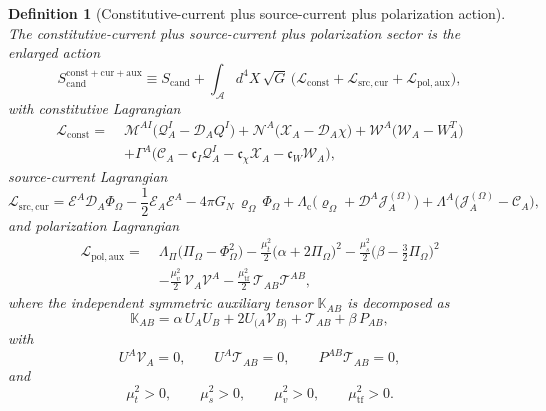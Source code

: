 \documentclass[11pt]{article}
\newcommand{\Sub}{\mathcal{A}}
\newcommand{\ProjSub}{P}
\newcommand{\SpatialD}{\mathcal D}
\newcommand{\FlowPot}{\Phi_\Omega}
\newcommand{\BalanceField}{\Pi_\Omega}
\newcommand{\BalMult}{\Lambda_\Pi}
\newcommand{\SourceDensity}{\varrho_\Omega}
\newcommand{\SourceCurrent}{\mathcal J^{(\Omega)}}
\newcommand{\ConstCurrent}{\mathcal C}
\newcommand{\QCarrier}{\mathcal Q}
\newcommand{\ChiCarrier}{\mathcal X}
\newcommand{\TransCarrier}{\mathcal W}
\newcommand{\ContMult}{\Lambda_{\mathrm c}}
\newcommand{\CurrentMult}{\Lambda}
\newcommand{\ConstGamma}{\Gamma}
\newcommand{\QMult}{\mathscr M}
\newcommand{\ChiMult}{\mathscr N}
\newcommand{\TransMult}{\mathscr W}
\newcommand{\SourceFlux}{\mathcal E}
\newcommand{\AuxPol}{\mathbb K}
\newcommand{\CandAction}{S_{\mathrm{cand}}}
\newcommand{\ConstitutiveAction}{S_{\mathrm{cand}}^{\mathrm{const+cur+aux}}}
\newtheorem{definition}{Definition}
\begin{document}
\begin{definition}[Constitutive-current plus source-current plus polarization action]
\label{def:action}
The \emph{constitutive-current plus source-current plus polarization sector} is the enlarged action
\begin{equation}
\ConstitutiveAction
\equiv
\CandAction
+
\int_{\Sub} d^4X\,\sqrt{G}\,
\bigl(
\mathcal L_{\mathrm{const}}
+\mathcal L_{\mathrm{src,cur}}
+\mathcal L_{\mathrm{pol,aux}}
\bigr),
\label{eq:fullaction}
\end{equation}
with constitutive Lagrangian
\begin{align}
\mathcal L_{\mathrm{const}}
=\;&
\QMult^{AI}\bigl(\QCarrier^I_A-\SpatialD_AQ^I\bigr)
+\ChiMult^A\bigl(\ChiCarrier_A-\SpatialD_A\chi\bigr)
+\TransMult^A\bigl(\TransCarrier_A-W_A^T\bigr)
\nonumber\\
&+\ConstGamma^A\bigl(
\ConstCurrent_A
-\mathfrak c_I\QCarrier^I_A
-\mathfrak c_\chi\ChiCarrier_A
-\mathfrak c_W\TransCarrier_A
\bigr),
\label{eq:lconst}
\end{align}
source-current Lagrangian
\begin{equation}
\mathcal L_{\mathrm{src,cur}}
=
\SourceFlux^A\SpatialD_A\FlowPot
-\frac12 \SourceFlux_A\SourceFlux^A
-4\pi G_N\,\SourceDensity\,\FlowPot
+\ContMult\bigl(\SourceDensity+\SpatialD^A\SourceCurrent_A\bigr)
+\CurrentMult^A\bigl(\SourceCurrent_A-\ConstCurrent_A\bigr),
\label{eq:lcur}
\end{equation}
and polarization Lagrangian
\begin{align}
\mathcal L_{\mathrm{pol,aux}}
=\;&
\BalMult\bigl(\BalanceField-\FlowPot^2\bigr)
-\frac{\mu_t^2}{2}\bigl(\alpha+2\BalanceField\bigr)^2
-\frac{\mu_s^2}{2}\bigl(\beta-\tfrac32\BalanceField\bigr)^2
\nonumber\\
&-\frac{\mu_v^2}{2}\,\mathcal V_A\mathcal V^A
-\frac{\mu_{\mathrm{tf}}^2}{2}\,\mathcal T_{AB}\mathcal T^{AB},
\label{eq:laux}
\end{align}
where the independent symmetric auxiliary tensor \(\AuxPol_{AB}\) is decomposed as
\begin{equation}
\AuxPol_{AB}
=
\alpha\,U_AU_B
+2U_{(A}\mathcal V_{B)}
+\mathcal T_{AB}
+\beta\,\ProjSub_{AB},
\label{eq:Kdecomp}
\end{equation}
with
\begin{equation}
U^A\mathcal V_A=0,
\qquad
U^A\mathcal T_{AB}=0,
\qquad
\ProjSub^{AB}\mathcal T_{AB}=0,
\label{eq:TVcond}
\end{equation}
and
\begin{equation}
\mu_t^2>0,
\qquad
\mu_s^2>0,
\qquad
\mu_v^2>0,
\qquad
\mu_{\mathrm{tf}}^2>0.
\label{eq:masses}
\end{equation}
\end{definition}
\end{document}
